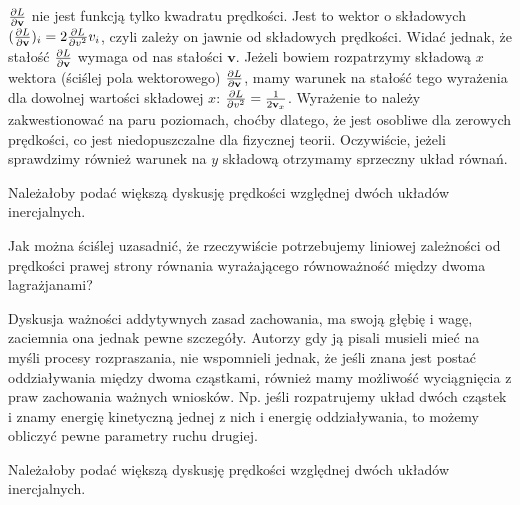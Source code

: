 \documentclass[a4paper,11pt]{article}
\begin{document}
\start {} $\frac{ \partial L }{ \partial \mathbf{v} }$ nie jest
funkcją tylko kwadratu prędkości. Jest to wektor o składowych
$( \frac{ \partial L }{ \partial \mathbf{v} } )_{ i } = 2 \frac{
  \partial L }{ \partial { v^{ 2 } } } v_{ i }$, czyli zależy on
jawnie od składowych prędkości. Widać jednak, że stałość
$\frac{ \partial L }{ \partial \mathbf{v} }$ wymaga od nas stałości
$\mathbf{ v }$. Jeżeli bowiem rozpatrzymy składową $x$ wektora
(ściślej pola wektorowego)
$\frac{ \partial L }{ \partial \mathbf{v} }$, mamy warunek na stałość
tego wyrażenia dla dowolnej wartości składowej $x$:
$\frac{ \partial L }{ \partial { v^{ 2 } } } = \frac{ 1 }{ 2
  \mathbf{v}_{ x } }$. Wyrażenie to należy zakwestionować na paru
poziomach, choćby dlatego, że jest osobliwe dla zerowych prędkości, co
jest niedopuszczalne dla fizycznej teorii. Oczywiście, jeżeli
sprawdzimy również warunek na $y$ składową otrzymamy sprzeczny układ
równań.

\vspace{\spaceFour}



\start {} Należałoby podać większą dyskusję prędkości względnej
dwóch układów inercjalnych.

\vspace{\spaceFour}



\start {} Jak można ściślej uzasadnić, że rzeczywiście
potrzebujemy liniowej zależności od prędkości prawej strony równania
wyrażającego równoważność między dwoma lagrażjanami? \Dok

\vspace{\spaceFour}



\start {} Dyskusja ważności addytywnych zasad zachowania, ma
swoją głębię i wagę, zaciemnia ona jednak pewne szczegóły. Autorzy gdy
ją pisali musieli mieć na myśli procesy rozpraszania, nie wspomnieli
jednak, że jeśli znana jest postać oddziaływania między dwoma
cząstkami, również mamy możliwość wyciągnięcia z praw zachowania
ważnych wniosków. Np. jeśli rozpatrujemy układ dwóch cząstek i znamy
energię kinetyczną jednej z nich i energię oddziaływania, to możemy
obliczyć pewne parametry ruchu drugiej.

\vspace{\spaceFour}



\start {} Należałoby podać większą dyskusję prędkości względnej
dwóch układów inercjalnych.
\end{document}
